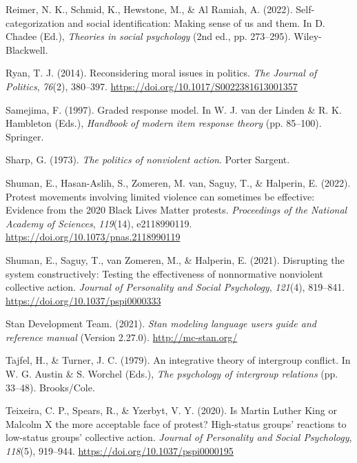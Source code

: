 \documentclass[twocolumn, 11pt, letterpaper]{article}
\newenvironment{CSLReferences}[2]{}{}
\begin{document}
\begin{CSLReferences}{1}{0}
\leavevmode{}%
Reimer, N. K., Schmid, K., Hewstone, M., \& Al Ramiah, A. (2022).
Self-categorization and social identification: Making sense of us and
them. In D. Chadee (Ed.), \emph{Theories in social psychology} (2nd ed.,
pp. 273--295). Wiley-Blackwell.

\leavevmode{}%
Ryan, T. J. (2014). Reconsidering moral issues in politics. \emph{The
Journal of Politics}, \emph{76}(2), 380--397.
\url{https://doi.org/10.1017/S0022381613001357}

\leavevmode{}%
Samejima, F. (1997). Graded response model. In W. J. van der Linden \&
R. K. Hambleton (Eds.), \emph{Handbook of modern item response theory}
(pp. 85--100). Springer.

\leavevmode{}%
Sharp, G. (1973). \emph{The politics of nonviolent action}. Porter
Sargent.

\leavevmode{}%
Shuman, E., Hasan-Aslih, S., Zomeren, M. van, Saguy, T., \& Halperin, E.
(2022). Protest movements involving limited violence can sometimes be
effective: Evidence from the 2020 {Black Lives Matter} protests.
\emph{Proceedings of the National Academy of Sciences}, \emph{119}(14),
e2118990119. \url{https://doi.org/10.1073/pnas.2118990119}

\leavevmode{}%
Shuman, E., Saguy, T., van Zomeren, M., \& Halperin, E. (2021).
Disrupting the system constructively: {Testing} the effectiveness of
nonnormative nonviolent collective action. \emph{Journal of Personality
and Social Psychology}, \emph{121}(4), 819--841.
\url{https://doi.org/10.1037/pspi0000333}

\leavevmode{}%
Stan Development Team. (2021). \emph{Stan modeling language users guide
and reference manual} (Version 2.27.0). \url{http://mc-stan.org/}

\leavevmode{}%
Tajfel, H., \& Turner, J. C. (1979). An integrative theory of intergroup
conflict. In W. G. Austin \& S. Worchel (Eds.), \emph{The psychology of
intergroup relations} (pp. 33--48). Brooks/Cole.

\leavevmode{}%
Teixeira, C. P., Spears, R., \& Yzerbyt, V. Y. (2020). Is {Martin}
{Luther} {King} or {Malcolm} {X} the more acceptable face of protest?
{High}-status groups' reactions to low-status groups' collective action.
\emph{Journal of Personality and Social Psychology}, \emph{118}(5),
919--944. \url{https://doi.org/10.1037/pspi0000195}


\end{CSLReferences}
\end{document}
